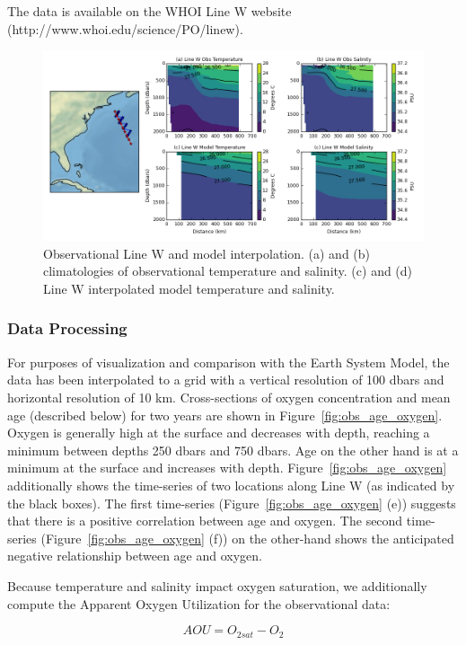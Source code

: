 The data is available on the WHOI Line W website (http://www.whoi.edu/science/PO/linew).

\begin{figure}
\centering
\includegraphics[width=\linewidth]{linew_interpolation.png}
\caption{Observational Line W and model interpolation. (a) and (b) climatologies of observational temperature and salinity. (c) and (d) Line W interpolated model temperature and salinity.}
\label{fig:observational_linew_model_interpolation}
\end{figure}

\subsubsection{Data Processing}
For purposes of visualization and comparison with the Earth System Model, the
data has been interpolated to a grid with a vertical resolution of 100 dbars and
horizontal resolution of 10 km. Cross-sections of oxygen concentration and mean
age (described below) for two years are shown in Figure~\ref{fig:obs_age_oxygen}.
Oxygen is generally high at the surface and decreases with depth, reaching a
minimum between depths 250 dbars and 750 dbars. Age on the other hand is at a
minimum at the surface and increases with depth. Figure~\ref{fig:obs_age_oxygen}
additionally shows the time-series of two locations along Line W (as indicated
by the black boxes). The first time-series (Figure~\ref{fig:obs_age_oxygen} (e))
suggests that there is a positive correlation between age and oxygen. The second
time-series (Figure~\ref{fig:obs_age_oxygen} (f)) on the other-hand shows the
anticipated negative relationship between age and oxygen.

Because temperature and salinity impact oxygen saturation, we additionally
compute the Apparent Oxygen Utilization for the observational data:

\begin{equation}
AOU = O_{2 sat} - O_2
\end{equation}

